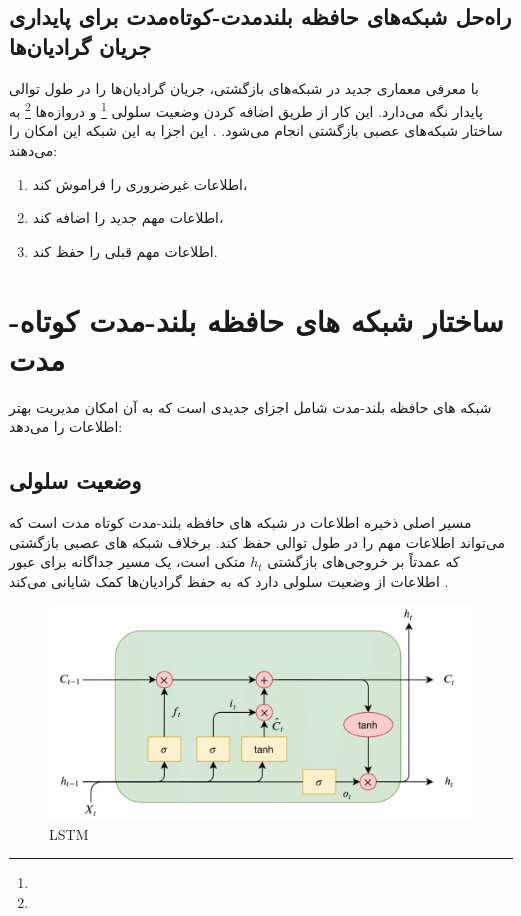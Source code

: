 \subsection{راه‌حل شبکه‌های حافظه بلندمدت-کوتاه‌مدت برای پایداری جریان گرادیان‌ها}
 با معرفی معماری جدید در شبکه‌های بازگشتی، جریان گرادیان‌ها را در طول توالی پایدار نگه می‌دارد. این کار از طریق اضافه کردن وضعیت سلولی \footnote{} و دروازه‌ها \footnote{} به ساختار شبکه‌های عصبی بازگشتی انجام می‌شود.
\cite{gers1999learning}.
این اجزا به این شبکه این امکان را می‌دهند:

\begin{enumerate}
	\item اطلاعات غیرضروری را فراموش کند،
	\item اطلاعات مهم جدید را اضافه کند،
	\item اطلاعات مهم قبلی را حفظ کند.
\end{enumerate}

\section{ساختار شبکه های حافظه بلند-مدت کوتاه-مدت}
شبکه های حافظه بلند-مدت  شامل اجزای جدیدی است که به آن امکان مدیریت بهتر اطلاعات را می‌دهد:




\subsection{وضعیت سلولی}
مسیر اصلی ذخیره اطلاعات در  شبکه های حافظه بلند-مدت کوتاه مدت است که می‌تواند اطلاعات مهم را در طول توالی حفظ کند. برخلاف شبکه های عصبی بازگشتی که عمدتاً بر خروجی‌های بازگشتی \( h_t \) متکی است،  یک مسیر جداگانه برای عبور اطلاعات از وضعیت سلولی دارد که به حفظ گرادیان‌ها کمک شایانی می‌کند
\cite{hochreiter1997long}.


 \begin{figure}[h]
	\centering
	\begin{minipage}[b]{0.7\textwidth}
		\centering
		\includegraphics[width=\textwidth]{transformer_images/lstm.png}
		\caption{LSTM}
		\label{fig:LSTM}
	\end{minipage}
	\hfill
	
\end{figure}


